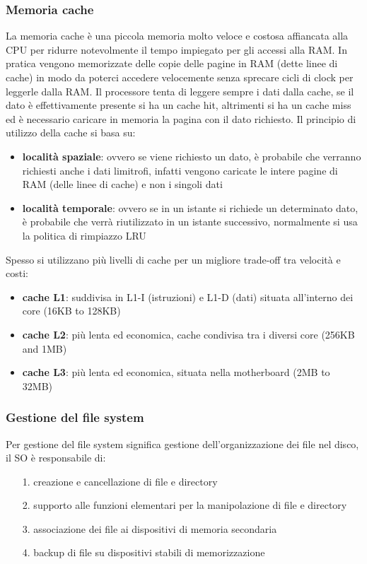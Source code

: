 \documentclass[a4paper]{article}
\begin{document}
\subsubsection*{Memoria cache}
La memoria cache è una piccola memoria molto veloce e costosa affiancata alla CPU per ridurre notevolmente il tempo impiegato
per gli accessi alla RAM. In pratica vengono memorizzate delle copie delle pagine in RAM (dette linee di cache) in modo da poterci
accedere velocemente senza sprecare cicli di clock per leggerle dalla RAM. Il processore tenta di leggere sempre i dati dalla
cache, se il dato è effettivamente presente si ha un cache hit, altrimenti si ha un cache miss ed è necessario caricare in memoria
la pagina con il dato richiesto.
\newpage
\noindent
Il principio di utilizzo della cache si basa su:
\begin{itemize}
	\item \textbf{località spaziale}: ovvero se viene richiesto un dato, è probabile che verranno richiesti anche i dati limitrofi,
	infatti vengono caricate le intere pagine di RAM (delle linee di cache) e non i singoli dati
	\item \textbf{località temporale}: ovvero se in un istante si richiede un determinato dato, è probabile che verrà riutilizzato
	in un istante successivo, normalmente si usa la politica di rimpiazzo LRU
\end{itemize}
\noindent
Spesso si utilizzano più livelli di cache per un migliore trade-off tra velocità e costi:
\begin{itemize}
	\item \textbf{cache L1}: suddivisa in L1-I (istruzioni) e L1-D (dati) situata all'interno dei core (16KB to 128KB)
	\item \textbf{cache L2}: più lenta ed economica, cache condivisa tra i diversi core (256KB and 1MB)
	\item \textbf{cache L3}: più lenta ed economica, situata nella motherboard (2MB to 32MB)
\end{itemize}

\subsubsection*{Gestione del file system}
Per gestione del file system significa gestione dell'organizzazione dei file nel disco, il SO è responsabile di:
\begin{itemize}
	\item[1.] creazione e cancellazione di file e directory
	\item[2.] supporto alle funzioni elementari per la manipolazione di file e directory
	\item[3.] associazione dei file ai dispositivi di memoria secondaria
	\item[4.] backup di file su dispositivi stabili di memorizzazione
\end{itemize}
\end{document}
